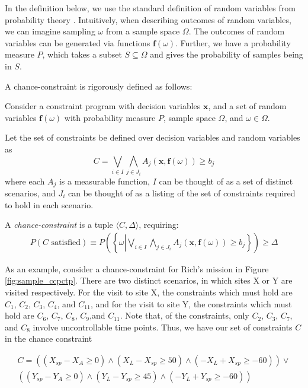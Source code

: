 \documentclass[jair,twoside,11pt,theapa]{article}
\begin{document}
In the definition below, we use the standard definition of random variables
from probability theory \cite{durrett2010probability}. Intuitively, when
describing outcomes of random variables, we can imagine sampling $\omega$ from a
sample space $\Omega$. The outcomes of random variables can be generated via
functions $\mathbf{f}(\omega)$. Further, we have a probability measure $P$,
which takes a subset $S\subseteq \Omega$ and gives the probability of samples
being in $S$.

A chance-constraint is rigorously defined as follows:

\begin{mydef}
Consider a constraint program with decision variables $\mathbf{x}$, and a set of random variables $\mathbf{f}(\omega)$ with probability measure $P$, sample space $\Omega$, and $\omega\in \Omega$. 

Let the set of constraints be defined over decision variables and random variables as 
\[C = \bigvee_{i\in I}\bigwedge_{j\in J_i} A_j(\mathbf{x},\mathbf{f}(\omega))\geq b_j \]
where each $A_j$ is a measurable function, $I$ can be thought of as a set of distinct scenarios, and $J_i$ can be thought of as a listing of the set of constraints required to hold in each scenario.

A \emph{chance-constraint} is a tuple $\langle C, \Delta\rangle$, requiring:
\begin{align}
P(C\text{ satisfied}) \equiv P\left(\left\{\omega\left|\bigvee_{i\in I}\bigwedge_{j\in J_i} A_j(\mathbf{x},\mathbf{f}(\omega))\geq b_j \right.\right\}\right) \geq \Delta
\end{align}
\label{def:chance-constraint}
\end{mydef}

As an example, consider a chance-constraint for Rich's mission in Figure \ref{fig:sample_ccpctp}. There are two distinct scenarios, in which sites X or Y are visited respectively. For the visit to site X, the constraints which must hold are $C_1$, $C_2$, $C_3$, $C_4$, and $C_{11}$, and for the visit to site Y, the constraints which must hold are $C_6$, $C_7$, $C_8$, $C_9$,and $C_{11}$. Note that, of the constraints, only $C_2$, $C_3$, $C_7$, and $C_8$ involve uncontrollable time points. Thus, we have our set of constraints $C$ in the chance constraint


\begin{align*}
C = \left((X_{sp}-X_A\geq 0) \land (X_L-X_{sp}\geq 50) \land (-X_L+X_{sp}\geq -60) \right) \lor \\
\left((Y_{sp}-Y_A\geq 0)\land(Y_L-Y_{sp}\geq 45)\land(-Y_L+Y_{sp}\geq -60)\right)
\end{align*}
\end{document}
